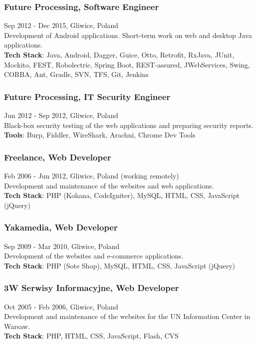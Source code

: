 \documentclass{article}
\begin{document}
      \subsubsection*{Future Processing, Software Engineer}
      Sep 2012 - Dec 2015, Gliwice, Poland\\[0.3em]
      Development of Android applications. Short-term work on web and desktop Java applications.\\
      \textbf{Tech Stack}: Java, Android, Dagger, Guice, Otto, Retrofit, RxJava, 
      JUnit, Mockito, FEST, Robolectric, Spring Boot, REST-assured, JWebServices, 
      Swing, CORBA, Ant, Gradle, SVN, TFS, Git, Jenkins

      \subsubsection*{Future Processing, IT Security Engineer}
      Jun 2012 - Sep 2012, Gliwice, Poland\\[0.3em]
      Black-box security testing of the web applications and preparing security reports.\\
      \textbf{Tools}: Burp, Fiddler, WireShark, Arachni, Chrome Dev Tools

      \subsubsection*{Freelance, Web Developer}
      Feb 2006 - Jun 2012, Gliwice, Poland (working remotely)\\[0.3em]
      Development and maintenance of the websites and web applications.\\
      \textbf{Tech Stack}: PHP (Kohana, CodeIgniter), MySQL, HTML, CSS, JavaScript (jQuery)

      \subsubsection*{Yakamedia, Web Developer}
      Sep 2009 - Mar 2010, Gliwice, Poland\\[0.3em]
      Development of the websites and e-commerce applications.\\
      \textbf{Tech Stack}: PHP (Sote Shop), MySQL, HTML, CSS, JavaScript (jQuery)

      \subsubsection*{3W Serwisy Informacyjne, Web Developer}
      Oct 2005 - Feb 2006, Gliwice, Poland\\[0.3em]
      Development and maintenance of the websites for the UN Information Center in Warsaw.\\
      \textbf{Tech Stack}: PHP, HTML, CSS, JavaScript, Flash, CVS
\end{document}
